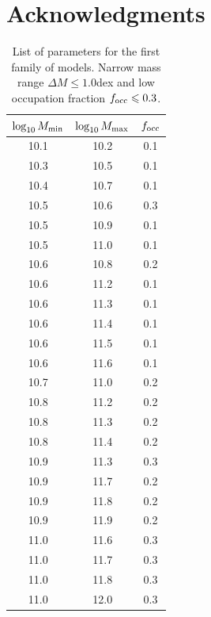\documentclass[usenatbib]{mn2e}
\begin{document}
\section*{Acknowledgments} 




\begin{table}
\begin{center}
\begin{tabular}{ccc}\hline\hline
$\log_{10}M_{\rm min}$ & $\log_{10}M_{\rm max}$ & $f_{\rm occ}$\\\hline
10.1& 10.2& 0.1\\
10.3& 10.5& 0.1\\
10.4& 10.7& 0.1\\
10.5& 10.6& 0.3\\
10.5& 10.9& 0.1\\
10.5& 11.0& 0.1\\
10.6& 10.8& 0.2\\
10.6& 11.2& 0.1\\
10.6& 11.3& 0.1\\
10.6& 11.4& 0.1\\
10.6& 11.5& 0.1\\
10.6& 11.6& 0.1\\
10.7& 11.0& 0.2\\
10.8& 11.2& 0.2\\
10.8& 11.3& 0.2\\
10.8& 11.4& 0.2\\
10.9& 11.3& 0.3\\
10.9& 11.7& 0.2\\
10.9& 11.8& 0.2\\
10.9& 11.9& 0.2\\
11.0& 11.6& 0.3\\
11.0& 11.7& 0.3\\
11.0& 11.8& 0.3\\
11.0& 12.0& 0.3\\\hline\hline
\end{tabular}
\end{center}
\caption{\label{table:thirdfamily}List of parameters for the first family of models. Narrow
  mass range $\Delta M\leq 1.0$dex and low occupation fraction $f_{\rm occ}\leq 0.3$.}
\end{table}
\end{document}
